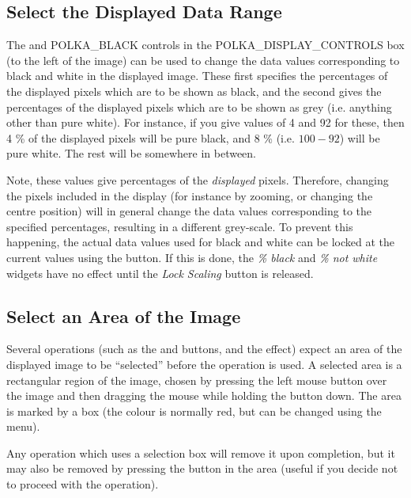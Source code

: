 \documentclass[11pt,nolof]{starlink}
\providecommand{\mylabel}[1] {\xlabel{#1}\label{#1}}
\begin{document}
\subsection {\mylabel{POLKA_IMAGE_SCALING}Select the Displayed Data Range}
The  and 
{POLKA_BLACK} controls in the 
{POLKA_DISPLAY_CONTROLS} box (to the left of the image) can be used to
change the data values corresponding to black and white in the displayed
image. These first specifies the percentages of the displayed pixels
which are to be shown as black, and the second gives the percentages of the
displayed pixels which are to be shown as grey (i.e. anything other than
pure white). For instance, if you give values of 4 and 92 for these, then
4 \% of the displayed pixels will be pure black, and 8 \% (i.e. $100-92$)
will be pure white. The rest will be somewhere in between.

Note, these values give percentages of the \emph{displayed} pixels.
Therefore, changing the pixels included in the display (for instance by
zooming, or changing the centre position) will in general change the data
values corresponding to the specified percentages, resulting in a
different grey-scale. To prevent this happening, the actual data values
used for black and white can be locked at the current values using the
 button. If this is done,
the \emph{\% black} and \emph{\% not white} widgets have no effect until the
\emph{Lock Scaling} button is released.

\subsection {\mylabel{POLKA_AREA_SELECTION}Select an Area of the Image}
Several operations (such as the  and
 buttons, and the  effect) expect an area of the displayed image
to be ``selected'' before the operation is used. A selected area is a
rectangular region of the image, chosen by pressing the left mouse button
over the image and then dragging the mouse while holding the button down.
The area is marked by a box (the colour is normally red, but can be
changed using the  menu).

Any operation which uses a selection box will remove it upon completion,
but it may also be removed by pressing the 
button in the  area
(useful if you decide not to proceed with the operation).
\end{document}
